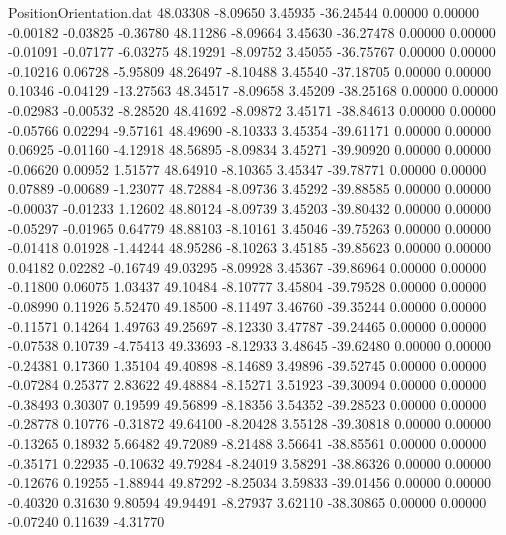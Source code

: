 \begin{filecontents}{PositionOrientation.dat}
  48.03308   -8.09650    3.45935   -36.24544    0.00000    0.00000   -0.00182   -0.03825   -0.36780
  48.11286   -8.09664    3.45630   -36.27478    0.00000    0.00000   -0.01091   -0.07177   -6.03275
  48.19291   -8.09752    3.45055   -36.75767    0.00000    0.00000   -0.10216    0.06728   -5.95809
  48.26497   -8.10488    3.45540   -37.18705    0.00000    0.00000    0.10346   -0.04129  -13.27563
  48.34517   -8.09658    3.45209   -38.25168    0.00000    0.00000   -0.02983   -0.00532   -8.28520
  48.41692   -8.09872    3.45171   -38.84613    0.00000    0.00000   -0.05766    0.02294   -9.57161
  48.49690   -8.10333    3.45354   -39.61171    0.00000    0.00000    0.06925   -0.01160   -4.12918
  48.56895   -8.09834    3.45271   -39.90920    0.00000    0.00000   -0.06620    0.00952    1.51577
  48.64910   -8.10365    3.45347   -39.78771    0.00000    0.00000    0.07889   -0.00689   -1.23077
  48.72884   -8.09736    3.45292   -39.88585    0.00000    0.00000   -0.00037   -0.01233    1.12602
  48.80124   -8.09739    3.45203   -39.80432    0.00000    0.00000   -0.05297   -0.01965    0.64779
  48.88103   -8.10161    3.45046   -39.75263    0.00000    0.00000   -0.01418    0.01928   -1.44244
  48.95286   -8.10263    3.45185   -39.85623    0.00000    0.00000    0.04182    0.02282   -0.16749
  49.03295   -8.09928    3.45367   -39.86964    0.00000    0.00000   -0.11800    0.06075    1.03437
  49.10484   -8.10777    3.45804   -39.79528    0.00000    0.00000   -0.08990    0.11926    5.52470
  49.18500   -8.11497    3.46760   -39.35244    0.00000    0.00000   -0.11571    0.14264    1.49763
  49.25697   -8.12330    3.47787   -39.24465    0.00000    0.00000   -0.07538    0.10739   -4.75413
  49.33693   -8.12933    3.48645   -39.62480    0.00000    0.00000   -0.24381    0.17360    1.35104
  49.40898   -8.14689    3.49896   -39.52745    0.00000    0.00000   -0.07284    0.25377    2.83622
  49.48884   -8.15271    3.51923   -39.30094    0.00000    0.00000   -0.38493    0.30307    0.19599
  49.56899   -8.18356    3.54352   -39.28523    0.00000    0.00000   -0.28778    0.10776   -0.31872
  49.64100   -8.20428    3.55128   -39.30818    0.00000    0.00000   -0.13265    0.18932    5.66482
  49.72089   -8.21488    3.56641   -38.85561    0.00000    0.00000   -0.35171    0.22935   -0.10632
  49.79284   -8.24019    3.58291   -38.86326    0.00000    0.00000   -0.12676    0.19255   -1.88944
  49.87292   -8.25034    3.59833   -39.01456    0.00000    0.00000   -0.40320    0.31630    9.80594
  49.94491   -8.27937    3.62110   -38.30865    0.00000    0.00000   -0.07240    0.11639   -4.31770

\end{filecontents}
